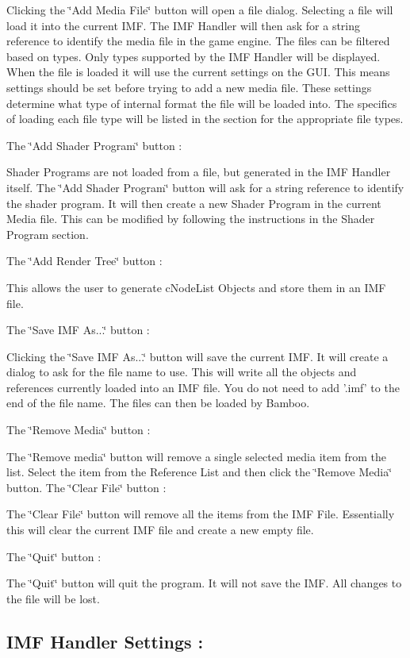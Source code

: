  Clicking the \char`\"{}Add Media File\char`\"{} button will open a file dialog. Selecting a file will load it into the current IMF. The IMF Handler will then ask for a string reference to identify the media file in the game engine. The files can be filtered based on types. Only types supported by the IMF Handler will be displayed. When the file is loaded it will use the current settings on the GUI. This means settings should be set before trying to add a new media file. These settings determine what type of internal format the file will be loaded into. The specifics of loading each file type will be listed in the section for the appropriate file types. \par
 The \char`\"{}Add Shader Program\char`\"{} button :\par
 Shader Programs are not loaded from a file, but generated in the IMF Handler itself. The \char`\"{}Add Shader Program\char`\"{} button will ask for a string reference to identify the shader program. It will then create a new Shader Program in the current Media file. This can be modified by following the instructions in the Shader Program section. \par
 The \char`\"{}Add Render Tree\char`\"{} button :\par
 This allows the user to generate cNodeList Objects and store them in an IMF file. \par
 The \char`\"{}Save IMF As...\char`\"{} button :\par
 Clicking the \char`\"{}Save IMF As...\char`\"{} button will save the current IMF. It will create a dialog to ask for the file name to use. This will write all the objects and references currently loaded into an IMF file. You do not need to add '.imf' to the end of the file name. The files can then be loaded by Bamboo. \par
 The \char`\"{}Remove Media\char`\"{} button :\par
 The \char`\"{}Remove media\char`\"{} button will remove a single selected media item from the list. Select the item from the Reference List and then click the \char`\"{}Remove Media\char`\"{} button. The \char`\"{}Clear File\char`\"{} button :\par
 The \char`\"{}Clear File\char`\"{} button will remove all the items from the IMF File. Essentially this will clear the current IMF file and create a new empty file. \par
 The \char`\"{}Quit\char`\"{} button :\par
 The \char`\"{}Quit\char`\"{} button will quit the program. It will not save the IMF. All changes to the file will be lost. \hypertarget{_using_engine_page_IMFSettings}{}\subsection{IMF Handler Settings :}\label{_using_engine_page_IMFSettings}
